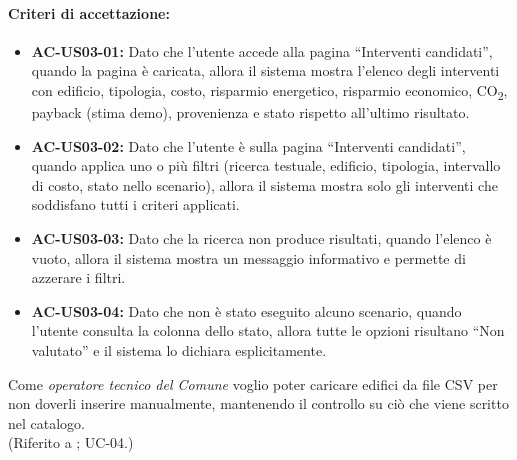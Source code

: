 \paragraph{Criteri di accettazione:}
\begin{itemize}[leftmargin=1.4em]
    \item \textbf{AC-US03-01:} Dato che l'utente accede alla pagina ``Interventi candidati'', quando la pagina è caricata, allora il sistema mostra l'elenco degli interventi con edificio, tipologia, costo, risparmio energetico, risparmio economico, CO\textsubscript{2}, payback (stima demo), provenienza e stato rispetto all'ultimo risultato.
    \item \textbf{AC-US03-02:} Dato che l'utente è sulla pagina ``Interventi candidati'', quando applica uno o più filtri (ricerca testuale, edificio, tipologia, intervallo di costo, stato nello scenario), allora il sistema mostra solo gli interventi che soddisfano tutti i criteri applicati.
    \item \textbf{AC-US03-03:} Dato che la ricerca non produce risultati, quando l'elenco è vuoto, allora il sistema mostra un messaggio informativo e permette di azzerare i filtri.
    \item \textbf{AC-US03-04:} Dato che non è stato eseguito alcuno scenario, quando l'utente consulta la colonna dello stato, allora tutte le opzioni risultano ``Non valutato'' e il sistema lo dichiara esplicitamente.
\end{itemize}

 \label{us:import}
Come \textit{operatore tecnico del Comune} voglio poter caricare edifici da file CSV per non doverli inserire manualmente, mantenendo il controllo su ciò che viene scritto nel catalogo. \\ (Riferito a ; UC-04.)

